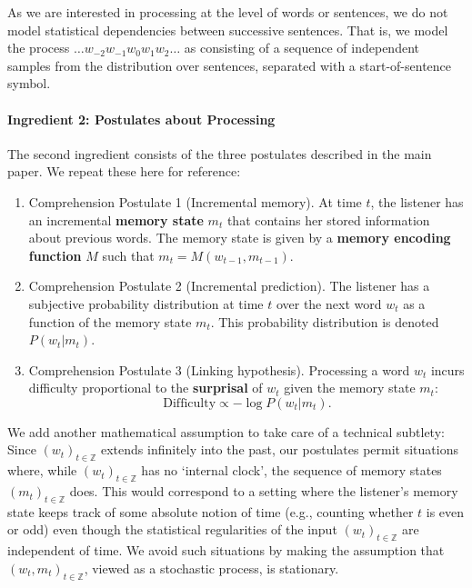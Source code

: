 \documentclass[11pt,letterpaper]{article}
\newcommand{\key}[1]{\textbf{#1}}
\begin{document}
As we are interested in processing at the level of words or sentences, we do not model statistical dependencies between successive sentences.
That is, we model the process $\dots w_{-2} w_{-1} w_0 w_{1} w_{2} \dots$ as consisting of a sequence of independent samples from the distribution over sentences, separated with a start-of-sentence symbol.

\paragraph{Ingredient 2: Postulates about Processing}
The second ingredient consists of the three postulates described in the main paper.
We repeat these here for reference:
\begin{enumerate}
    \item Comprehension Postulate 1 (Incremental memory). At time $t$, the listener has an incremental \key{memory state} $m_t$ that contains her stored information about previous words. The memory state is given by a \key{memory encoding function} $M$ such that $m_t = M(w_{t-1}, m_{t-1})$.
    \item Comprehension Postulate 2 (Incremental prediction). The listener has a subjective probability distribution at time $t$ over the next word $w_t$ as a function of the memory state $m_t$. This probability distribution is denoted $P(w_t|m_t)$.
    \item Comprehension Postulate 3 (Linking hypothesis). Processing a word $w_t$ incurs difficulty proportional to the \key{surprisal} of $w_t$ given the memory state $m_t$:
    \begin{equation}
    \label{eq:lossy-surp}
    \text{Difficulty} \propto -\log P(w_t | m_t).
\end{equation}
\end{enumerate}


We add another mathematical assumption to take care of a technical subtlety: Since $(w_t)_{t \in \mathbb{Z}}$ extends infinitely into the past, our postulates permit situations where, while $(w_t)_{t \in \mathbb{Z}}$ has no `internal clock', the sequence of memory states $(m_t)_{t \in \mathbb{Z}}$ does.
This would correspond to a setting where the listener's memory state keeps track of some absolute notion of time (e.g., counting whether $t$ is even or odd) even though the statistical regularities of the input $(w_t)_{t \in \mathbb{Z}}$ are independent of time.
We avoid such situations by making the assumption that $(w_t, m_t)_{t \in \mathbb{Z}}$, viewed as a stochastic process, is stationary.
\end{document}
